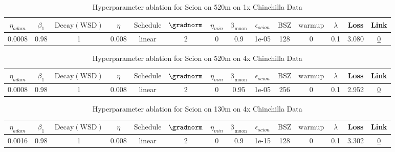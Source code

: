 \begin{table}[H]
\centering
\caption{Hyperparameter ablation for Scion on 520m on 1x Chinchilla Data}
\label{tab:ablation_scion_520m_1}
\begin{tabular}{cccccccccccccc}
\toprule
$\eta_{adam}$ & $\beta_1$ & $\mathrm{Decay (WSD)}$ & $\eta$ & $\mathrm{Schedule}$ & $\gradnorm$ & $\eta_{min}$ & $\mathrm{\beta_{muon}}$ & $\epsilon_{scion}$ & $\mathrm{BSZ}$ & $\mathrm{warmup}$ & $\lambda$ & Loss & Link \\
\midrule
0.0008 & 0.98 & 1 & 0.008 & linear & 2 & 0 & 0.9 & 1e-05 & 128 & 0 & 0.1 & 3.080 & \href{https://wandb.ai/stanford-mercury/optimizer-scaling/runs/sweep-520m-10B-scioncff10blr0.008-wd0.1-minlr0-warmup0-b10.98-gn-c03799}{0} \\
\midrule
\bottomrule
\end{tabular}
\end{table}

\begin{table}[H]
\centering
\caption{Hyperparameter ablation for Scion on 520m on 4x Chinchilla Data}
\label{tab:ablation_scion_520m_4}
\begin{tabular}{cccccccccccccc}
\toprule
$\eta_{adam}$ & $\beta_1$ & $\mathrm{Decay (WSD)}$ & $\eta$ & $\mathrm{Schedule}$ & $\gradnorm$ & $\eta_{min}$ & $\mathrm{\beta_{muon}}$ & $\epsilon_{scion}$ & $\mathrm{BSZ}$ & $\mathrm{warmup}$ & $\lambda$ & Loss & Link \\
\midrule
0.0008 & 0.98 & 1 & 0.008 & linear & 2 & 0 & 0.95 & 1e-05 & 256 & 0 & 0.1 & 2.952 & \href{https://wandb.ai/stanford-mercury/optimizer-scaling/runs/sweep-520m-42B-scion941d43lr0.008-wd0.1-minlr0-warmup0-b10.98-gn-ab5aa7}{0} \\
\midrule
\bottomrule
\end{tabular}
\end{table}

\begin{table}[H]
\centering
\caption{Hyperparameter ablation for Scion on 130m on 4x Chinchilla Data}
\label{tab:ablation_scion_130m_4}
\begin{tabular}{cccccccccccccc}
\toprule
$\eta_{adam}$ & $\beta_1$ & $\mathrm{Decay (WSD)}$ & $\eta$ & $\mathrm{Schedule}$ & $\gradnorm$ & $\eta_{min}$ & $\mathrm{\beta_{muon}}$ & $\epsilon_{scion}$ & $\mathrm{BSZ}$ & $\mathrm{warmup}$ & $\lambda$ & Loss & Link \\
\midrule
0.0016 & 0.98 & 1 & 0.008 & linear & 2 & 0 & 0.9 & 1e-15 & 128 & 0 & 0.1 & 3.302 & \href{https://wandb.ai/stanford-mercury/optimizer-scaling/runs/sweep-130m-10B-scion9698d1lr0.008-wd0.1-minlr0-warmup0-b10.98-gn-7282fc}{0} \\
\midrule
\bottomrule
\end{tabular}
\end{table}

